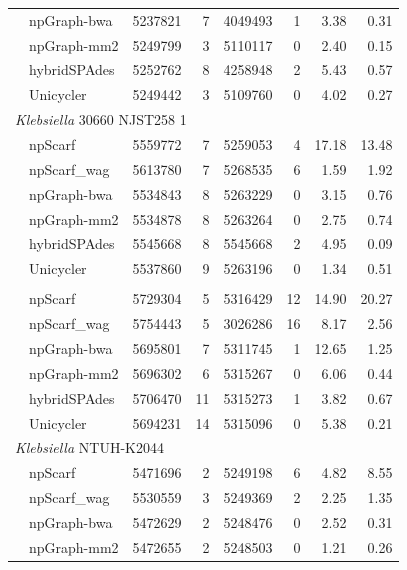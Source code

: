 \documentclass[10pt,letterpaper]{article}
\begin{document}
\begin{longtable}[!hpt]{llcrrrrr}
\rowcolor{Gray}
& npGraph-bwa & 5237821  &  7  &  4049493  &  1  &  3.38 & 0.31\\*
\rowcolor{Gray}
& npGraph-mm2 &  5249799 &  3  &  5110117  &  0  &  2.40 & 0.15\\*
\rowcolor{Gray}
& hybridSPAdes & 5252762  &  8  &  4258948  &  2  &  5.43 &  0.57\\*
\rowcolor{Gray}
& Unicycler & 5249442  &  3  &  5109760  &  0  & 4.02 & 0.27 \\
\hline
\multicolumn{8}{l}{\emph{Klebsiella} 30660 NJST258 1} \\* %
\nobreakmidrule
& npScarf & 5559772  &  7  &  5259053  &  4  & 17.18  & 13.48\\*
& npScarf\_wag & 5613780  &  7  &  5268535  &  6  & 1.59  & 1.92\\*
& npGraph-bwa & 5534843  &  8  &  5263229  &  0  & 3.15  & 0.76\\*
& npGraph-mm2 & 5534878  &  8  &  5263264  &  0  & 2.75  & 0.74\\*
& hybridSPAdes &  5545668 & 8   &  5545668  &  2  & 4.95  & 0.09 \\*
& Unicycler & 5537860  &  9  &  5263196  &  0  & 1.34  & 0.51 \\
\hline
\rowcolor{Gray}
\multicolumn{8}{l}{\emph{Klebsiella} MGH 78578} \\* %
\nobreakmidrule
\rowcolor{Gray}
& npScarf &  5729304 &  5  &  5316429  &  12  & 14.90  & 20.27\\*
\rowcolor{Gray}
& npScarf\_wag & 5754443  &  5  &  3026286  &  16  &  8.17 & 2.56\\*
\rowcolor{Gray}
& npGraph-bwa &  5695801 &  7  &  5311745  &  1  & 12.65  & 1.25\\*
\rowcolor{Gray}
& npGraph-mm2 & 5696302  &  6  &  5315267  &  0  &  6.06 & 0.44\\*
\rowcolor{Gray}
& hybridSPAdes &  5706470 &  11  &  5315273  &  1  & 3.82  &  0.67\\*
\rowcolor{Gray}
& Unicycler &  5694231 &  14  &  5315096  &  0  & 5.38 &  0.21\\
\hline
\multicolumn{8}{l}{\emph{Klebsiella} NTUH-K2044} \\* %
\nobreakmidrule
& npScarf & 5471696  &  2  &  5249198  &  6  & 4.82  &  8.55\\*
& npScarf\_wag & 5530559  &  3  &  5249369  &  2  &  2.25 &  1.35\\*
& npGraph-bwa & 5472629  &  2  &  5248476  & 0  & 2.52  &  0.31\\*
& npGraph-mm2 &  5472655 &  2  &  5248503  &  0 &  1.21 &  0.26\\*

\end{longtable}
\end{document}
